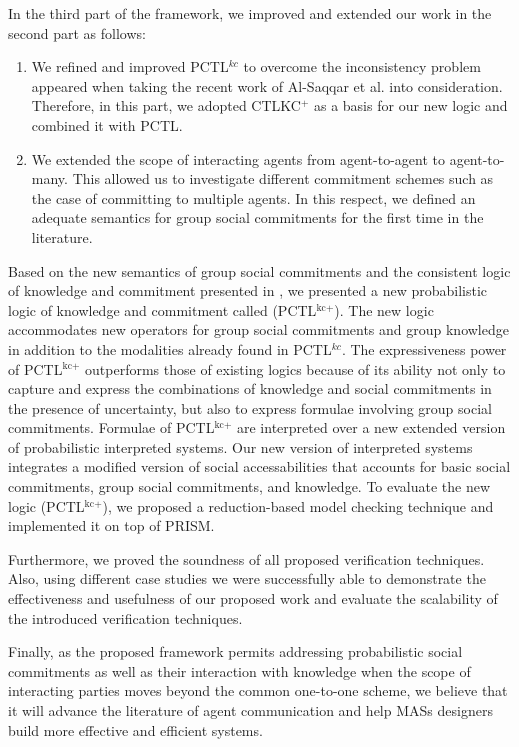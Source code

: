 In the third part of the framework, we improved and extended our work in the second part as follows:

\begin{enumerate}

\item We refined and improved PCTL$^{kc}$ to overcome the inconsistency problem appeared when taking the recent work of Al-Saqqar et al. \cite{Al-Saqqar2014a} into consideration. Therefore, in this part, we adopted CTLKC$^+$ \cite{Al-Saqqar2014a} as a basis for our new logic and combined it with PCTL.

\item We extended the scope of interacting agents from agent-to-agent to agent-to-many. This allowed us to investigate different commitment schemes such as the case of committing to multiple agents. In this respect, we defined an adequate semantics for group social commitments for the first time in the literature.
\end{enumerate}

\noindent Based on the new semantics of group social commitments and the consistent logic of knowledge and commitment presented in \cite{Al-Saqqar2014a}, we presented a new probabilistic logic of knowledge and commitment called (PCTL$^{\textrm{kc+}}$). The new logic accommodates new operators for group social commitments and group knowledge in addition to the modalities already found in PCTL$^{kc}$. The expressiveness power of  PCTL$^{\textrm{kc+}}$ outperforms those of existing logics because of its ability not only to capture and express the combinations of knowledge and social commitments in the presence of uncertainty, but also to express formulae involving group social commitments. Formulae of PCTL$^{\textrm{kc+}}$ are interpreted over a new extended version of probabilistic interpreted systems. Our new version of interpreted systems integrates a modified version of social accessabilities that accounts for basic social commitments, group social commitments, and knowledge. To evaluate the new logic (PCTL$^{\textrm{kc+}}$), we proposed a reduction-based model checking technique and implemented it on top of PRISM.

Furthermore, we proved the soundness of all proposed verification techniques. Also, using different case studies we were successfully able to demonstrate the effectiveness and usefulness of our proposed work and evaluate the scalability of the introduced verification techniques.

Finally, as the proposed framework permits addressing probabilistic social commitments as well as their interaction with knowledge when the scope of interacting parties moves beyond the common one-to-one scheme, we believe that it will advance the literature of agent communication and help MASs designers build more effective and efficient systems.

